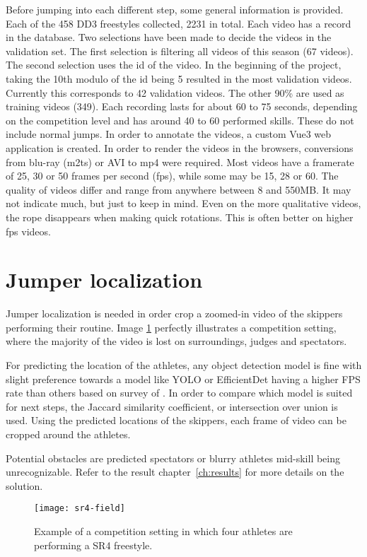 Before jumping into each different step, some general information is provided. Each of the 458 DD3 freestyles collected, 2231 in total. Each video has a record in the database. Two selections have been made to decide the videos in the validation set. The first selection is filtering all videos of this season (67 videos). The second selection uses the id of the video. In the beginning of the project, taking the 10th modulo of the id being 5 resulted in the most validation videos. Currently this corresponds to 42 validation videos. The other 90\% are used as training videos (349).
Each recording lasts for about 60 to 75 seconds, depending on the competition level and has around 40 to 60 performed skills. These do not include normal jumps. In order to annotate the videos, a custom Vue3 web application is created. In order to render the videos in the browsers, conversions from blu-ray (m2ts) or AVI to mp4 were required. Most videos have a framerate of 25, 30 or 50 frames per second (fps), while some may be 15, 28 or 60.
The quality of videos differ and range from anywhere between 8 and 550MB. It may not indicate much, but just to keep in mind. Even on the more qualitative videos, the rope disappears when making quick rotations. This is often better on higher fps videos.

\section{Jumper localization}

Jumper localization is needed in order crop a zoomed-in video of the skippers performing their routine. Image \ref{fig:sr4-field} perfectly illustrates a competition setting, where the majority of the video is lost on surroundings, judges and spectators.

For predicting the location of the athletes, any object detection model is fine with slight preference towards a model like YOLO or EfficientDet having a higher FPS rate than others based on survey of \textcite{Zaidi_2021}. In order to compare which model is suited for next steps, the Jaccard similarity coefficient, or intersection over union is used. 
Using the predicted locations of the skippers, each frame of video can be cropped around the athletes.

Potential obstacles are predicted spectators or blurry athletes mid-skill being unrecognizable. Refer to the result chapter~\ref{ch:results} for more details on the solution.

\begin{figure}
    \centering
    \texttt{[image: sr4-field]}
    \caption[Example jump rope competition setting]{Example of a competition setting in which four athletes are performing a SR4 freestyle.}
    \label{fig:sr4-field}
\end{figure}


